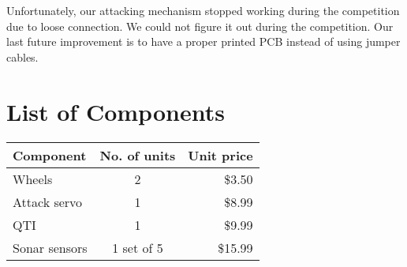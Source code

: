 \documentclass[11pt, letterpaper, oneside]{article}
\begin{document}
Unfortunately, our attacking mechanism stopped working during the competition due to loose connection. We could not figure it out during the competition. Our last future improvement is to have a proper printed PCB instead of using jumper cables.

\newpage
\section{List of Components}
\begin{table}[tbh]
	\label{tab:components}
	\begin{center}
		\begin{tabular}{|l|c|r|}
			\hline
			Component 		& 	No. of units	&	Unit price 	\\ 	\hline 
			Wheels	 		& 	2 				&	\$3.50 		\\
			Attack servo	&	1 				&	\$8.99 		\\
			QTI				&	1				&	\$9.99		\\
			Sonar sensors	&	1 set of 5		&	\$15.99		\\	\hline 
		\end{tabular}
	\end{center}
\end{table} 

\newpage
\end{document}
